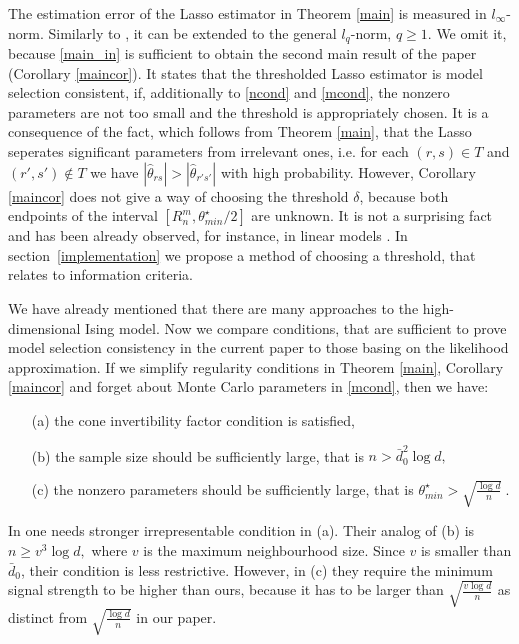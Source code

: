 \documentclass[twoside,11pt]{article}
\def\th{\theta}
\def\ths{\th^\star}
\def\hth{\hat{\theta}}
\def\rs{_{rs}}
\def\bd0{\bar{d} _0}
\begin{document}
The estimation error of the Lasso estimator in Theorem \ref{main} is measured in $l_\infty$-norm. Similarly to \citet{Cox13}, it can be extended to the general $l_q$-norm, $q \geq 1.$ We omit it, because \eqref{main_in} is sufficient to obtain the second main result of the paper (Corollary \ref{maincor}). It  states that the thresholded Lasso estimator is model selection consistent, if, additionally to \eqref{ncond} and \eqref{mcond}, the nonzero parameters are not too small and the threshold is appropriately chosen. It is a consequence of the fact, which follows from Theorem \ref{main}, that the Lasso seperates significant parameters from irrelevant ones, i.e. for each $(r,s) \in T$ and $(r',s') \notin T$ we have
$
|\hth \rs | >|\hth _{r's'}  |
$ 
with high probability. However, Corollary \ref{maincor} does not give a way of choosing the threshold $\delta$, because both endpoints of the interval $[R_n^m, \ths _{min}/2] $ are unknown. It is not a surprising fact and has been already observed, for instance, in linear models \citep[Theorem 8]{YeZhang10}. In section~\ref{implementation} we propose a method of choosing a threshold, that relates to information criteria.
 
We have already mentioned that there are many approaches to the high-dimensional Ising model.
Now we compare conditions, that are sufficient to prove model selection consistency in the current paper to those basing on the likelihood approximation. If we simplify regularity conditions in Theorem \ref{main}, Corollary \ref{maincor} and forget about Monte Carlo parameters in \eqref{mcond}, then we have:
\begin{enumerate}
\item[(a)] the cone invertibility factor condition is satisfied, 
\item[(b)] the sample size should be sufficiently large, that is $n>\bd0 ^2 \log d,$
\item[(c)] the nonzero parameters should be sufficiently large, that is $\ths_{min} > \sqrt{\frac{ \log d}{n}}\:.$ 
\end{enumerate}

In \citet[Corollary 1]{Ravi10} one needs stronger irrepresentable condition in (a).  Their analog of (b) is $n\geq v^3 \log d, $ where $v$ is the maximum neighbourhood size. Since $v$ is smaller than $\bd0$, their condition is less restrictive. 
However, in (c) they require the minimum signal strength to be higher than ours, because it has to be larger than  $\sqrt{\frac{v \log d}{n}}$ as distinct from $\sqrt{\frac{ \log d}{n}}$ in our paper.
\end{document}
